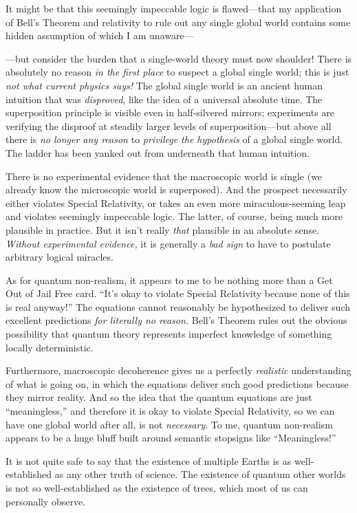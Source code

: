 {
 It might be that this seemingly impeccable logic is flawed---that
my application of Bell's Theorem and relativity to rule
out any single global world contains some hidden assumption of which I
am unaware---}

{
 {}---but consider the burden that a single-world theory must now
shoulder! There is absolutely no reason \textit{in the first place} to
suspect a global single world; this is just \textit{not what current
physics says!} The global single world is an ancient human intuition
that was \textit{disproved}, like the idea of a universal absolute
time. The superposition principle is visible even in half-silvered
mirrors; experiments are verifying the disproof at steadily larger
levels of superposition---but above all there is \textit{no longer any
reason} to \textit{privilege the hypothesis} of a global single world.
The ladder has been yanked out from underneath that human intuition.}

{
 There is no experimental evidence that the macroscopic world is
single (we already know the microscopic world is superposed). And the
prospect necessarily either violates Special Relativity, or takes an
even more miraculous-seeming leap and violates seemingly impeccable
logic. The latter, of course, being much more plausible in practice.
But it isn't really \textit{that} plausible in an
absolute sense. \textit{Without experimental evidence,} it is generally
a \textit{bad sign} to have to postulate arbitrary logical miracles.}

{
 As for quantum non-realism, it appears to me to be nothing more
than a Get Out of Jail Free card.
``It's okay to violate Special
Relativity because none of this is real anyway!'' The
equations cannot reasonably be hypothesized to deliver such excellent
predictions \textit{for literally no reason.} Bell's
Theorem rules out the obvious possibility that quantum theory
represents imperfect knowledge of something locally deterministic.}

{
 Furthermore, macroscopic decoherence gives us a perfectly
\textit{realistic} understanding of what is going on, in which the
equations deliver such good predictions because they mirror reality.
And so the idea that the quantum equations are just
``meaningless,'' and therefore it is
okay to violate Special Relativity, so we can have one global world
after all, is not \textit{necessary}. To me, quantum non-realism
appears to be a huge bluff built around semantic stopsigns like
``Meaningless!''}

{
 It is not quite safe to say that the existence of multiple Earths
is as well-established as any other truth of science. The existence of
quantum other worlds is not so well-established as the existence of
trees, which most of us can personally observe.}

